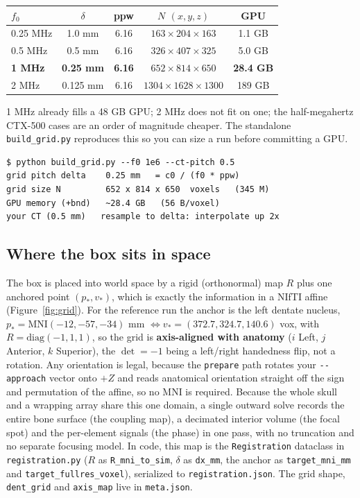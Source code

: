 \documentclass[10pt]{article}
\newcommand{\code}[1]{\lstinline[basicstyle=\ttfamily]|#1|}
\begin{document}
\begin{center}\small
\begin{tabular}{@{}lcccc@{}}
\toprule
$f_0$ & $\delta$ & ppw & $N$ $(x,y,z)$ & GPU \\
\midrule
0.25 MHz & 1.0 mm & 6.16 & $163\times204\times163$ & 1.1 GB \\
0.5 MHz & 0.5 mm & 6.16 & $326\times407\times325$ & 5.0 GB \\
\textbf{1 MHz} & \textbf{0.25 mm} & \textbf{6.16} & $652\times814\times650$ & \textbf{28.4 GB} \\
2 MHz & 0.125 mm & 6.16 & $1304\times1628\times1300$ & 189 GB \\
\bottomrule
\end{tabular}
\end{center}

1 MHz already fills a 48 GB GPU; 2 MHz does not fit on one; the half-megahertz CTX-500
cases are an order of magnitude cheaper. The standalone \code{build_grid.py} reproduces
this so you can size a run before committing a GPU.
\begin{lstlisting}[style=sh]
$ python build_grid.py --f0 1e6 --ct-pitch 0.5
grid pitch delta    0.25 mm   = c0 / (f0 * ppw)
grid size N         652 x 814 x 650  voxels   (345 M)
GPU memory (+bnd)   ~28.4 GB   (56 B/voxel)
your CT (0.5 mm)   resample to delta: interpolate up 2x
\end{lstlisting}

\subsection{Where the box sits in space}

The box is placed into world space by a rigid (orthonormal) map $R$ plus one anchored
point $(p_*,v_*)$, which is exactly the information in a NIfTI affine
(Figure~\ref{fig:grid}). For the reference run the anchor is the left dentate nucleus,
$p_*=\mathrm{MNI}(-12,-57,-34)$ mm $\Leftrightarrow v_*=(372.7,324.7,140.6)$ vox, with
$R=\mathrm{diag}(-1,1,1)$, so the grid is \textbf{axis-aligned with anatomy} ($i$ Left,
$j$ Anterior, $k$ Superior), the $\det=-1$ being a left/right handedness flip, not a
rotation. Any orientation is legal, because the \code{prepare} path rotates your
\code{--approach} vector onto $+Z$ and reads anatomical orientation straight off the
sign and permutation of the affine, so no MNI is required. Because the whole skull and a
wrapping array share this one domain, a single outward solve records the entire bone
surface (the coupling map), a decimated interior volume (the focal spot) and the
per-element signals (the phase) in one pass, with no truncation and no separate focusing
model. In code, this map is the \code{Registration} dataclass in \code{registration.py}
($R$ as \code{R_mni_to_sim}, $\delta$ as \code{dx_mm}, the anchor as
\code{target_mni_mm} and \code{target_fullres_voxel}), serialized to
\code{registration.json}. The grid shape, \code{dent_grid} and \code{axis_map} live in
\code{meta.json}.
\end{document}
